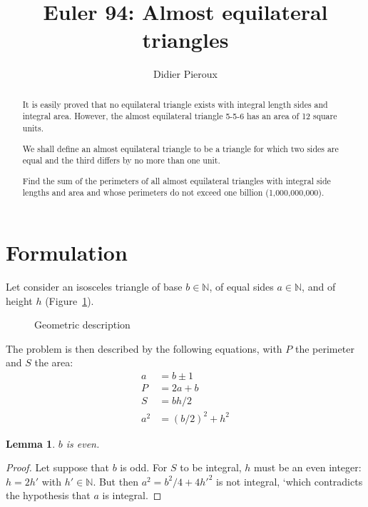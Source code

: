 \documentclass[11pt, twoside, a4paper]{article}
\newtheorem{lemma}[theorem]{Lemma}
\newcommand{\Figure}[1]{Figure~\ref{#1}}
\newcommand{\set}[1]{\mathbb{#1}}
\begin{document}
\title{Euler 94: Almost equilateral triangles}
\date{}
\author{Didier Pieroux}
\maketitle

\begin{abstract}
It is easily proved that no equilateral triangle exists with integral length sides and integral area. However, the almost equilateral triangle 5-5-6 has an area of 12 square units.

We shall define an almost equilateral triangle to be a triangle for which two sides are equal and the third differs by no more than one unit.

Find the sum of the perimeters of all almost equilateral triangles with integral side lengths and area and whose perimeters do not exceed one billion (1,000,000,000).
\end{abstract}

\section{Formulation}
Let consider an isosceles triangle of base $b\in\set N$, of equal sides $a\in\set N$, and of height $h$ (\Figure{fig:triangle1}).
  
\begin{figure}[h]
    \begin{center}
        \caption{Geometric description}
        \label{fig:triangle1}
    \end{center}
\end{figure}

The problem is then described by the following equations, with $P$ the perimeter and $S$ the area:
\begin{align}
    a & = b \pm 1 \\ \label{eq:a1}
    P & = 2a+b \\ 
    S & = bh/2 \\
    a^2 & = (b/2)^2 + h^2 \label{eq:pytha1}
\end{align} 
    
\begin{lemma}$b$ is even.\end{lemma}
\begin{proof} Let suppose that $b$ is odd. For $S$ to be integral, $h$ must be an even integer: $h=2h'$ with $h'\in\set N$. But then $a^2 = b^2/4 + 4h'^2$ is not integral, `which contradicts the hypothesis that $a$ is integral.
\end{proof}
\end{document}

